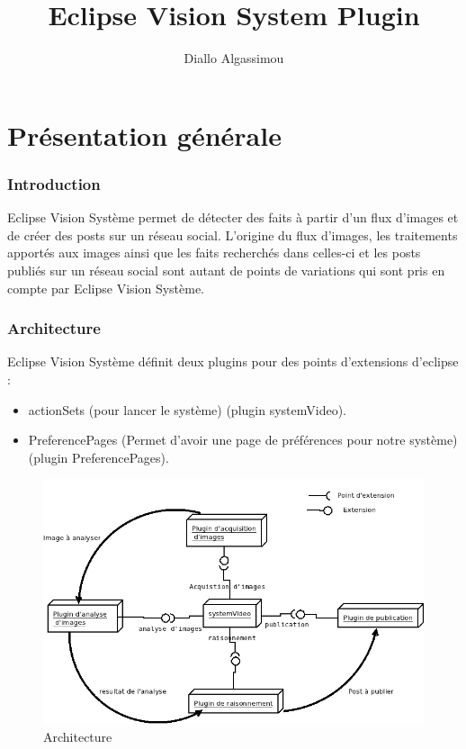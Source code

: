 \documentclass[a4paper , 12pt]{article}
\title{\bf Eclipse Vision System Plugin}
\author{Diallo Algassimou}
\begin{document}
\maketitle
\tableofcontents

\part*{Présentation générale}
\section{Introduction}
Eclipse Vision Système permet de détecter des faits à partir d'un flux d'images et de créer des posts sur un réseau social. L'origine du flux d'images, les traitements apportés aux images ainsi que les faits recherchés dans celles-ci et les posts publiés sur un réseau social sont autant de points de variations qui sont pris en compte par Eclipse Vision Système.

\section{Architecture}
Eclipse Vision Système définit deux plugins pour des points d'extensions d'eclipse :
\begin{itemize}
\item actionSets (pour lancer le système) (plugin systemVideo).
\item PreferencePages (Permet d'avoir une page de préférences pour notre système) (plugin PreferencePages).
\end{itemize}

\begin{figure}
  \includegraphics[scale=0.5]{images/architecture.png}
  \caption{Architecture}
  \label{fig:architecture}
\end{figure}
\end{document}
